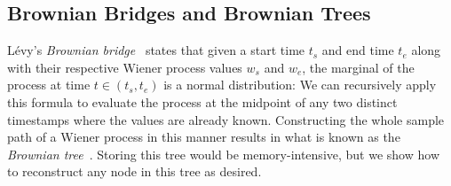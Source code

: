 \documentclass[twoside]{article}
\begin{document}
\subsection{Brownian Bridges and Brownian Trees}
L\'evy's \textit{Brownian bridge}~\citep{revuz2013continuous} states that given a start time $t_s$ and end time $t_e$ along with their respective Wiener process values $w_s$ and $w_e$, the marginal of the process at time $t \in (t_s, t_e)$ is a normal distribution:
We can recursively apply this formula to evaluate the process at the midpoint of any two distinct timestamps where the values are already known. Constructing the whole sample path of a Wiener process in this manner results in what is known as the \textit{Brownian tree}~\citep{gaines1997variable}.
Storing this tree would be memory-intensive, but we show how to reconstruct any node in this tree as desired.
\end{document}
